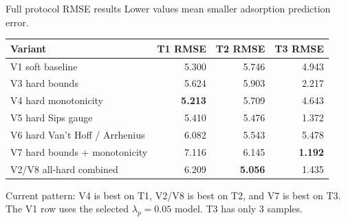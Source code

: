 \documentclass[aspectratio=169,10pt]{beamer}
\newcommand{\smallgray}[1]{\textcolor{projectGray}{#1}}
\newcommand{\best}[1]{\textbf{\textcolor{projectTeal}{#1}}}
\begin{document}
\begin{frame}{Full protocol RMSE results}
  \smallgray{Lower values mean smaller adsorption prediction error.}

  \vspace{0.25cm}
  \begin{table}
    \centering
    \begin{tabular}{lrrr}
      \toprule
      \textbf{Variant}              & \textbf{T1 RMSE} & \textbf{T2 RMSE} & \textbf{T3 RMSE} \\
      \midrule
      V1 soft baseline              & 5.300            & 5.746            & 4.943            \\
      V3 hard bounds                & 5.624            & 5.903            & 2.217            \\
      V4 hard monotonicity          & \best{5.213}     & 5.709            & 4.643            \\
      V5 hard Sips gauge            & 5.410            & 5.476            & 1.372            \\
      V6 hard Van't Hoff / Arrhenius & 6.082           & 5.543            & 5.478            \\
      V7 hard bounds + monotonicity & 7.116            & 6.145            & \best{1.192}     \\
      V2/V8 all-hard combined       & 6.209            & \best{5.056}     & 1.435            \\
      \bottomrule
    \end{tabular}
  \end{table}

  \vspace{0.2cm}
  \smallgray{Current pattern: V4 is best on T1, V2/V8 is best on T2, and V7 is best on T3. The V1 row uses the selected \(\lambda_p=0.05\) model. T3 has only 3 samples.}
\end{frame}
\end{document}
